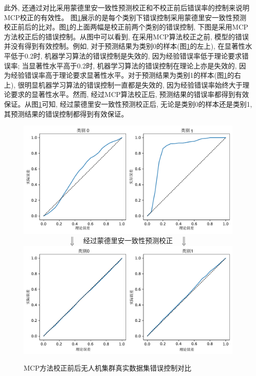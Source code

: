 此外, 还通过对比采用蒙德里安一致性预测校正和不校正前后错误率的控制来说明MCP校正的有效性。 图\ref{fig:validity}展示的是每个类别下错误控制采用蒙德里安一致性预测校正前后的比对。图\ref{fig:validity}的上面两幅是校正前两个类别的错误控制, 下图是采用MCP方法校正后的错误控制。从图中可以看到, 在采用MCP算法校正之前, 模型的错误并没有得到有效控制。例如, 对于预测结果为类别0的样本(图\ref{fig:validity}的左上), 在显著性水平低于0.2时, 机器学习算法的错误控制是失效的, 因为经验错误率低于理论要求错误率; 当显著性水平高于0.2时, 机器学习算法的错误控制在理论上亦是失效的, 因为经验错误率高于理论要求显著性水平。对于预测结果为类别1的样本(图\ref{fig:validity}的右上), 很明显机器学习算法的错误控制一直都是失效的, 因为经验错误率始终大于理论要求的显著性水平。然而, 经过MCP算法校正后, 预测结果的错误率都得到有效保证。从图\ref{fig:validity}可知, 经过蒙德里安一致性预测校正后, 无论是类别0的样本还是类别1, 其预测结果的错误控制都得到有效保证。
\begin{figure}[]
\centering
\includegraphics[width=1\linewidth]{Img/chapter8/invalidity}
$$\Downarrow \quad \textsf{经过蒙德里安一致性预测校正} \quad \Downarrow$$
\includegraphics[width=1\linewidth]{Img/chapter8/validity}
\caption{MCP方法校正前后无人机集群真实数据集错误控制对比}
\label{fig:validity}
\end{figure}

